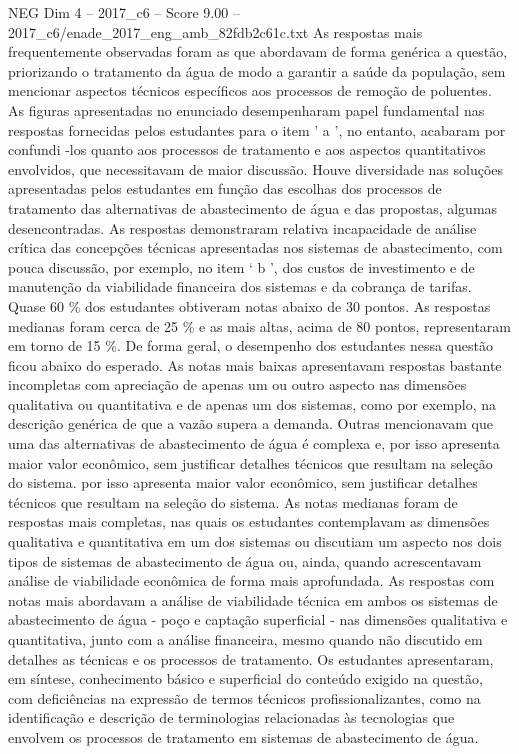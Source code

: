 \begin{textsample}{NEG Dim 4 – 2017\_c6 – Score 9.00 – 2017\_c6/enade\_2017\_eng\_amb\_82fdb2c61c.txt}
As respostas mais frequentemente observadas foram as que abordavam de forma genérica a questão, priorizando o tratamento da água de modo a garantir a saúde da população, sem mencionar aspectos técnicos específicos aos processos de remoção de poluentes.
As figuras apresentadas no enunciado desempenharam papel fundamental nas respostas fornecidas pelos estudantes para o item ' a ', no entanto, acabaram por confundi -los quanto aos processos de tratamento e aos aspectos quantitativos envolvidos, que necessitavam de maior discussão.
Houve diversidade nas soluções apresentadas pelos estudantes em função das escolhas dos processos de tratamento das alternativas de abastecimento de água e das propostas, algumas desencontradas.
As respostas demonstraram relativa incapacidade de análise crítica das concepções técnicas apresentadas nos sistemas de abastecimento, com pouca discussão, por exemplo, no item ‘ b ’, dos custos de investimento e de manutenção da viabilidade financeira dos sistemas e da cobrança de tarifas.
Quase 60 \% dos estudantes obtiveram notas abaixo de 30 pontos.
As respostas medianas foram cerca de 25 \% e as mais altas, acima de 80 pontos, representaram em torno de 15 \%.
De forma geral, o desempenho dos estudantes nessa questão ficou abaixo do esperado.
As notas mais baixas apresentavam respostas bastante incompletas com apreciação de apenas um ou outro aspecto nas dimensões qualitativa ou quantitativa e de apenas um dos sistemas, como por exemplo, na descrição genérica de que a vazão supera a demanda.
Outras mencionavam que uma das alternativas de abastecimento de água é complexa e, por isso apresenta maior valor econômico, sem justificar detalhes técnicos que resultam na seleção do sistema. por isso apresenta maior valor econômico, sem justificar detalhes técnicos que resultam na seleção do sistema.
As notas medianas foram de respostas mais completas, nas quais os estudantes contemplavam as dimensões qualitativa e quantitativa em um dos sistemas ou discutiam um aspecto nos dois tipos de sistemas de abastecimento de água ou, ainda, quando acrescentavam análise de viabilidade econômica de forma mais aprofundada.
As respostas com notas mais abordavam a análise de viabilidade técnica em ambos os sistemas de abastecimento de água - poço e captação superficial - nas dimensões qualitativa e quantitativa, junto com a análise financeira, mesmo quando não discutido em detalhes as técnicas e os processos de tratamento.
Os estudantes apresentaram, em síntese, conhecimento básico e superficial do conteúdo exigido na questão, com deficiências na expressão de termos técnicos profissionalizantes, como na identificação e descrição de terminologias relacionadas às tecnologias que envolvem os processos de tratamento em sistemas de abastecimento de água.

\end{textsample}
